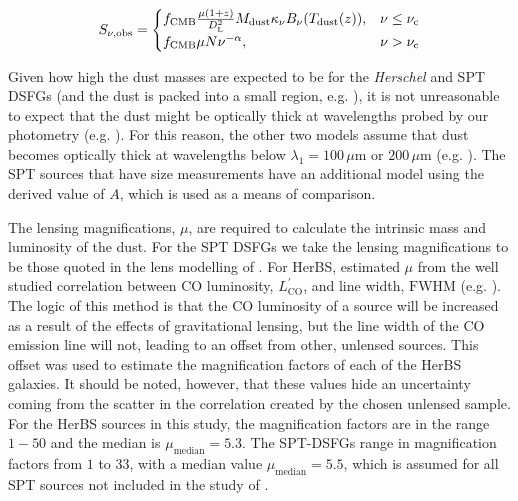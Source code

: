 \begin{equation}
	S_{\nu, \textrm{obs}} =  
	\begin{cases}
		f_{\textrm{CMB}}\frac{\mu (1+z)}{D_{\rm L}^2} M_{\textrm{dust}} \kappa_\nu B_\nu(T_{\textrm{dust}}(z)), & \nu \le \nu_{\rm c} \\
		f_{\textrm{CMB}}\mu N \nu^{-\alpha}, & \nu > \nu_{\rm c} \\
	\end{cases}
    \label{eq:modified_blackbody_optically_thin}
\end{equation}

Given how high the dust masses are expected to be for the \textit{Herschel} and SPT DSFGs (and the dust is packed into a small region, e.g. \citealt{Ikarashi_2017}), it is not unreasonable to expect that the dust might be optically thick at wavelengths probed by our photometry (e.g. \citealt{Conley_2011, Casey_2019, Cortzen_2020}). For this reason, the other two models assume that dust becomes optically thick at wavelengths below $\lambda_1 = 100\,\mu$m or $200\,\mu$m (e.g. \citealt{Blain_2003, Draine_2006, Conley_2011, Rangwala_2011, Greve_2012, Casey_2014a, Spilker_2016, Casey_2019, Cooper_2022, Drew_2022}). The SPT sources that have size measurements have an additional model using the derived value of $A$, which is used as a means of comparison.

The lensing magnifications, $\mu$, are required to calculate the intrinsic mass and luminosity of the dust. For the SPT DSFGs we take the lensing magnifications to be those quoted in the lens modelling of \citealt{Spilker_2016}. For HerBS, \citealt{Urquhart_2022} estimated $\mu$ from the well studied correlation between CO luminosity, $L^{'}_{\textrm{CO}}$, and line width, $\textrm{FWHM}$ (e.g. \citealt{Bothwell_2013, Dannerbauer_2017, Neri_2020}). The logic of this method is that the CO luminosity of a source will be increased as a result of the effects of gravitational lensing, but the line width of the CO emission line will not, leading to an offset from other, unlensed sources. This offset was used to estimate the magnification factors of each of the HerBS galaxies. It should be noted, however, that these values hide an uncertainty coming from the scatter in the correlation created by the chosen unlensed sample. For the HerBS sources in this study, the magnification factors are in the range $1 - 50$ and the median is $\mu_{\textrm{median}} = 5.3$. The SPT-DSFGs range in magnification factors from $1$ to $33$, with a median value $\mu_{\textrm{median}} = 5.5$, which is assumed for all SPT sources not included in the study of \citealt{Spilker_2016}. 

